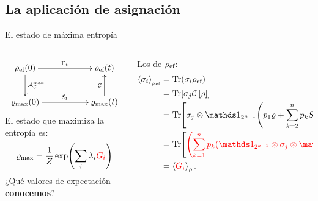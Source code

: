 \subsection{La aplicación de asignación}
\begin{frame}{El estado de máxima entropía}
    \begin{columns}
        \begin{column}{0.5\textwidth}
            \begin{displaymath}
                \xymatrix{
                  {\rho_{\ef}(0)} \ar[rr]^{\Gamma_{t}} \ar[d]^{\mcA_{\mcC}^{\max}}
                  && {\rho_{\ef}(t)}\\
                  {\varrho_{\max}(0)} \ar[rr]^{\mcE_{t}}
                  && {\varrho_{\max}(t)} \ar[u]^{\mcC}
                }
              \end{displaymath}
              El estado que maximiza la entropía es:
              \begin{equation}
                  \varrho_{\max}=\frac{1}{Z}\exp(\sum_{i}\lambda_{i}{\color{red}G_{i}})\nonumber
              \end{equation}\pause
              ¿Qué valores de expectación \textbf{conocemos}?
        \end{column}
        \begin{column}{0.5\textwidth}
            Los de $\rho_{\text{ef}}$\pause:
            \begin{align}
                \expval{\pauli{i}}_{\rho_{\ef}}&=\Tr(\pauli{i}\rho_{\ef})\nonumber\\
                &=\Tr[\sigma_{j}\CG{\varrho}]\nonumber\\
                &=\Tr[\sigma_{j}\otimes\Id_{2^{n-1}}\qty(p_{1}\varrho+\sum_{k=2}^{n}p_{k}S_{1,k}\varrho S_{1,k})]\nonumber\\
                &=\Tr[{\color{red}\qty(\sum_{k=1}^{n}p_{k}(\Id_{2^{k-1}}\otimes\sigma_{j}\otimes\Id_{2^{n-k}}))}\varrho]\nonumber\\
                &=\expval{{\color{red}G_{i}}}_{\varrho}.\nonumber
            \end{align}
        \end{column}
    \end{columns}
\end{frame}
